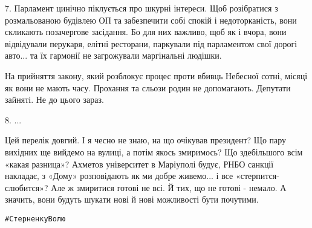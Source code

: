 7. Парламент цинічно піклується про шкурні інтереси. Щоб розібратися з
розмальованою будівлею ОП та забезпечити собі спокій і недоторканість, вони
скликають позачергове засідання. Бо для них важливо, щоб як і вчора, вони
відвідували перукаря, елітні ресторани, паркували під парламентом свої дорогі
авто... та їх гармонії не загрожували маргінальні людішки. 

На прийняття закону, який розблокує процес проти вбивць Небесної сотні, місяці
як вони не мають часу. Прохання та сльози родин не допомагають. Депутати
зайняті. Не до цього зараз. 

8. ...

Цей перелік довгий. І я чесно не знаю, на що очікував президент? Що пару
вихідних ще вийдемо на вулиці, а потім якось змиримось? Що здебільшого всім
«какая разница»? Ахметов університет в Маріуполі будує, РНБО санкції накладає,
з «Дому» розповідають як ми добре живемо... і все «стерпится-слюбится»? Але ж
змиритися готові не всі. Й тих, що не готові - немало. А значить, вони будуть
шукати нові й нові можливості бути почутими.

\verb|#СтерненкуВолю|
